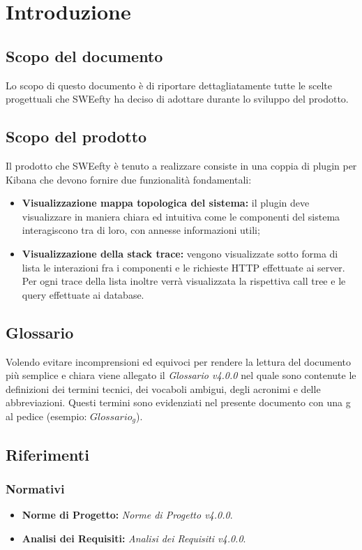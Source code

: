 \section{Introduzione}
\label{sec:intro}
\subsection{Scopo del documento}
Lo scopo di questo documento è di riportare dettagliatamente tutte le scelte progettuali che SWEefty ha deciso di adottare durante lo sviluppo del prodotto.

\subsection{Scopo del prodotto}
Il prodotto che SWEefty è tenuto a realizzare consiste in una coppia di plugin per Kibana che devono fornire due funzionalità fondamentali:
\begin{itemize}
	\item \textbf{Visualizzazione mappa topologica del sistema:} il plugin deve visualizzare in maniera chiara ed intuitiva come le componenti del sistema interagiscono tra di loro, con annesse informazioni utili;
	\item \textbf{Visualizzazione della stack trace:} vengono visualizzate sotto forma di lista le interazioni fra i componenti e le richieste HTTP effettuate ai server. Per ogni trace della lista inoltre verrà visualizzata la rispettiva call tree e le query effettuate ai database.
\end{itemize}

\subsection{Glossario}
Volendo evitare incomprensioni  ed equivoci per rendere la lettura del documento più semplice e chiara viene allegato il \emph{Glossario v4.0.0} nel quale sono contenute le definizioni dei termini tecnici, dei vocaboli ambigui, degli acronimi e delle abbreviazioni. Questi termini sono evidenziati nel presente documento con una g al pedice (esempio: $Glossario_{g}$).
\subsection{Riferimenti}
\subsubsection{Normativi}
\begin{itemize}
	\item \textbf{Norme di Progetto:} \emph{Norme di Progetto v4.0.0}.
	\item \textbf{Analisi dei Requisiti:} \emph{Analisi dei Requisiti v4.0.0}.
\end{itemize}

